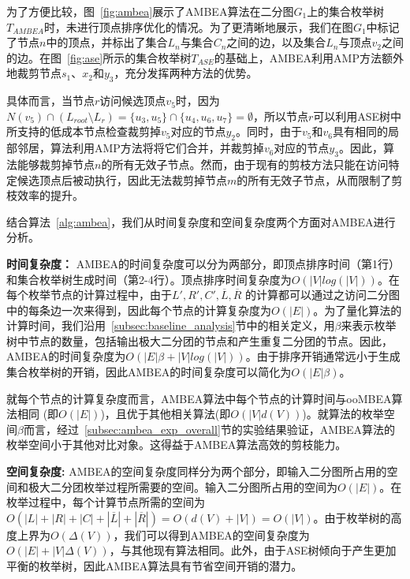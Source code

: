 \begin{example}
  \label{example:ambea}
  为了方便比较，图~\ref{fig:ambea}展示了AMBEA算法在二分图$G_1$上的集合枚举树$T_{AMBEA}$时，未进行顶点排序优化的情况。为了更清晰地展示，我们在图$G_1$中标记了节点$n$中的顶点，并标出了集合$L_n$与集合$C_n$之间的边，以及集合$L_n$与顶点$v_2$之间的边。在图~\ref{fig:ase}所示的集合枚举树$T_{ASE}$的基础上，AMBEA利用AMP方法额外地裁剪节点$s_1$、$x_2$和$y_3$，充分发挥两种方法的优势。

  具体而言，当节点$r$访问候选顶点$v_5$时，因为$N(v_5) \cap (L_{root} \setminus L_r) = \{u_3, u_5\} \cap \{u_4, u_6, u_7\} = \emptyset$，所以节点$r$可以利用ASE树中所支持的低成本节点检查裁剪掉$v_5$对应的节点$y_2$。同时，由于$v_5$和$v_6$具有相同的局部邻居，算法利用AMP方法将将它们合并，并裁剪掉$v_6$对应的节点$y_3$。因此，算法能够裁剪掉节点$n$的所有无效子节点。然而，由于现有的剪枝方法只能在访问特定候选顶点后被动执行，因此无法裁剪掉节点$m$的所有无效子节点，从而限制了剪枝效率的提升。
\end{example}

结合算法~\ref{alg:ambea}，我们从时间复杂度和空间复杂度两个方面对AMBEA进行分析。

\textbf{时间复杂度：} AMBEA的时间复杂度可以分为两部分，即顶点排序时间（第1行）和集合枚举树生成时间（第2-4行）。顶点排序时间复杂度为$O(|V|log(|V|))$。在每个枚举节点的计算过程中，由于$L', R', C',\overline{L},\overline{R}$ 的计算都可以通过之访问二分图中的每条边一次来得到，因此每个节点的计算复杂度为$O(|E|)$。为了量化算法的计算时间，我们沿用~\ref{subsec:baseline_analysis}节中的相关定义，用$\beta$来表示枚举树中节点的数量，包括输出极大二分团的节点和产生重复二分团的节点。因此，AMBEA的时间复杂度为$O(|E|\beta + |V|log(|V|))$。由于排序开销通常远小于生成集合枚举树的开销，因此AMBEA的时间复杂度可以简化为$O(|E|\beta)$。

就每个节点的计算复杂度而言，AMBEA算法中每个节点的计算时间与ooMBEA算法相同 (即$O(|E|)$)，且优于其他相关算法(即$O(|V|d(V))$)。就算法的枚举空间$\beta$而言，经过~\ref{subsec:ambea_exp_overall}节的实验结果验证，AMBEA算法的枚举空间小于其他对比对象。这得益于AMBEA算法高效的剪枝能力。


\textbf{空间复杂度: } AMBEA的空间复杂度同样分为两个部分，即输入二分图所占用的空间和极大二分团枚举过程所需要的空间。输入二分图所占用的空间为$O(|E|)$。在枚举过程中，每个计算节点所需的空间为$O(|L|+|R|+|C|+|\overline{L}| + |\overline{R}|) = O(d(V) + |V|) = O(|V|)$。由于枚举树的高度上界为$O(\Delta(V))$，我们可以得到AMBEA的空间复杂度为$O(|E|+|V|\Delta(V))$，与其他现有算法相同。此外，由于ASE树倾向于产生更加平衡的枚举树，因此AMBEA算法具有节省空间开销的潜力。

